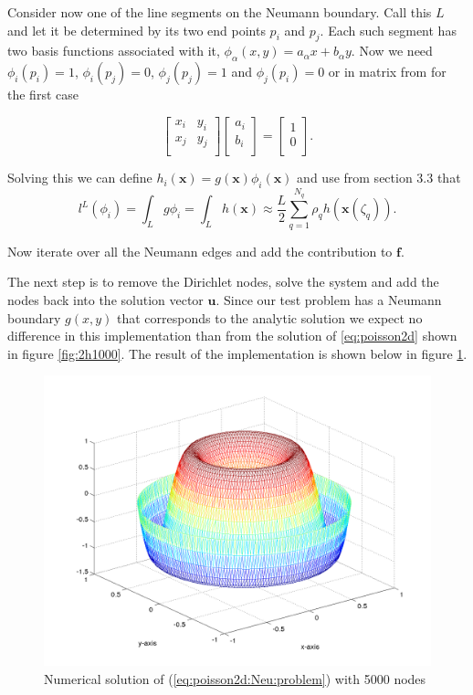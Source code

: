 \documentclass[paper=a4, fontsize=11pt]{scrartcl} %
\begin{document}
Consider now one of the line segments on the Neumann boundary. Call this $L$ and let it be determined by its two end points $p_i$ and $p_j$. Each such segment has two basis functions associated with it, $\phi_{\alpha}(x,y)=a_{\alpha}x+b_{\alpha}y$. Now we need $\phi_{i}(p_i)=1$, $\phi_{i}(p_j)=0$, $\phi_{j}(p_j)=1$ and $\phi_{j}(p_i)=0$ or in matrix from for the first case

\[\begin{bmatrix}
  x_i & y_i\\
  x_j & y_j\\
 \end{bmatrix}
\begin{bmatrix} a_i \\ b_i\\ \end{bmatrix} =
\begin{bmatrix}
  1 \\ 0\\ 
\end{bmatrix}.\]

Solving this we can define $h_i(\mathbf{x})=g(\mathbf{x})\phi_i(\mathbf{x})$ and use from section 3.3 that 
\[
l^L(\phi_i)=\int_{L} \! g \phi_i = \int_{L} \! h(\mathbf{x}) \approx \frac{L}{2}\sum_{q=1}^{N_q} \rho_{q}h(\mathbf{x}(\zeta_q)).\]

Now iterate over all the Neumann edges and add the contribution to $\mathbf{f}$.

The next step is to remove the Dirichlet nodes, solve the system and add the nodes back into the solution vector $\mathbf{u}$.  Since our test problem has a Neumann boundary $g(x,y)$ that corresponds to the analytic solution we expect no difference in this implementation than from the solution of \eqref{eq:poisson2d} shown in figure \ref{fig:2h1000}. The result of the implementation is shown below in figure \ref{fig:3d5000}.

\begin{figure}[!htb]
\center
  \includegraphics[width=0.6\linewidth]{3d5000.png}
  \caption{Numerical solution of (\ref{eq:poisson2d:Neu:problem}) with 5000 nodes}\label{fig:3d5000}
\end{figure}
\end{document}
